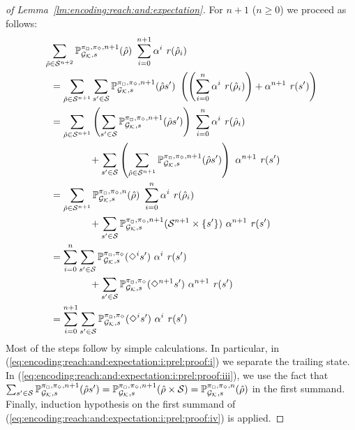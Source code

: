 \begin{proof}[of Lemma~\ref{lm:encoding:reach:and:expectation}]
  For $n+1$ ($n\geq0$) we proceed as follows:
  \begin{align}
    \sum_{\hat{\rho} \in \sgnodes^{n+2}} \Prob^{\strat_{\maxplay},\strat_{\minplay},n+1}_{\StochGK,s}(\hat{\rho})\mult\sum^{n+1}_{i=0}\alpha^i\mult\reward(\hat{\rho}_i)
    \hspace{-14em} & \notag\\
    & =
    \sum_{\hat{\rho} \in \sgnodes^{n+1}}\sum_{s' \in \sgnodes} \Prob^{\strat_{\maxplay},\strat_{\minplay},n+1}_{\StochGK,s}(\hat{\rho}s')\mult\left(\left(\sum^{n}_{i=0}\alpha^i\mult\reward(\hat{\rho}_i)\right)+\alpha^{n+1}\mult\reward(s')\right)
    \label{eq:encoding:reach:and:expectation:i:prel:proof:i}\\
    & =
    \sum_{\hat{\rho} \in \sgnodes^{n+1}}\left(\sum_{s' \in \sgnodes} \Prob^{\strat_{\maxplay},\strat_{\minplay},n+1}_{\StochGK,s}(\hat{\rho}s')\right)\mult\sum^{n}_{i=0}\alpha^i\mult\reward(\hat{\rho}_i) \notag\\
    & \qquad\qquad
    {}+\sum_{s' \in \sgnodes} \left(\sum_{\hat{\rho} \in \sgnodes^{n+1}}\Prob^{\strat_{\maxplay},\strat_{\minplay},n+1}_{\StochGK,s}(\hat{\rho}s')\right)\mult\alpha^{n+1}\mult\reward(s')
    \notag\\%
    & =
    \sum_{\hat{\rho} \in \sgnodes^{n+1}}\Prob^{\strat_{\maxplay},\strat_{\minplay},n}_{\StochGK,s}(\hat{\rho})\mult\sum^{n}_{i=0}\alpha^i\mult\reward(\hat{\rho}_i) \notag\\
    & \qquad\qquad
    {}+\sum_{s' \in \sgnodes} \Prob^{\strat_{\maxplay},\strat_{\minplay},n+1}_{\StochGK,s}(\sgnodes^{n+1}\times\{s'\})\mult\alpha^{n+1}\mult\reward(s')
    \label{eq:encoding:reach:and:expectation:i:prel:proof:iii}\\
    & =
    \sum^{n}_{i=0} \sum_{s' \in \sgnodes} \Prob^{\strat_{\maxplay},\strat_{\minplay}}_{\StochGK,s}(\Finally^i s')\mult\alpha^i\mult\reward(s') \notag\\
    & \qquad\qquad
    {}+\sum_{s' \in \sgnodes} \Prob^{\strat_{\maxplay},\strat_{\minplay}}_{\StochGK,s}(\Finally^{n+1}s')\mult\alpha^{n+1}\mult\reward(s')
    \label{eq:encoding:reach:and:expectation:i:prel:proof:iv}\\
    & =
    \sum^{n+1}_{i=0} \sum_{s' \in \sgnodes} \Prob^{\strat_{\maxplay},\strat_{\minplay}}_{\StochGK,s}(\Finally^i s')\mult\alpha^i\mult\reward(s') \notag
  \end{align}
  Most of the steps follow by simple calculations.  In particular, in
  (\ref{eq:encoding:reach:and:expectation:i:prel:proof:i}) we separate
  the trailing state.  In
  (\ref{eq:encoding:reach:and:expectation:i:prel:proof:iii}), we use
  the fact that
  $\sum_{s'\in\mathcal{S}}\mathbb{P}^{\pi_{{\Box}},\pi_{{\Diamond}},n+1}_{{\mathcal{G}_{\mathcal{K}}},s}(\hat{\rho}s')
  =
  \mathbb{P}^{\pi_{{\Box}},\pi_{{\Diamond}},n+1}_{{\mathcal{G}_{\mathcal{K}}},s}(\hat{\rho}\times\mathcal{S})
  =
  \mathbb{P}^{\pi_{{\Box}},\pi_{{\Diamond}},n}_{{\mathcal{G}_{\mathcal{K}}},s}(\hat{\rho})$
  in the first summand.  Finally, induction hypothesis on the first
  summand of (\ref{eq:encoding:reach:and:expectation:i:prel:proof:iv})
  is applied.


\end{proof}
